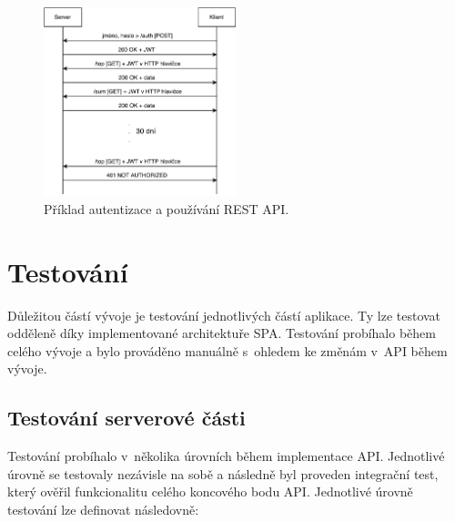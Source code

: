 \begin{figure}[ht]
    \centering
    \includegraphics[width=0.5\textwidth]{fig/auth_flow.pdf}
    \caption{Příklad autentizace a používání REST API.} \label{fig:auth}
\end{figure}

\chapter{Testování}

Důležitou částí vývoje je testování jednotlivých částí aplikace. Ty lze testovat odděleně díky implementované architektuře SPA. Testování probíhalo během celého vývoje a bylo prováděno manuálně s~ohledem ke změnám v~API během vývoje.

\section{Testování serverové části}

Testování probíhalo v~několika úrovních během implementace API. Jednotlivé úrovně se testovaly nezávisle na sobě a následně byl proveden integrační test, který ověřil funkcionalitu celého koncového bodu API. Jednotlivé úrovně testování lze definovat následovně:

